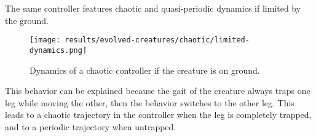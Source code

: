 \documentclass[main]{subfiles}
\begin{document}
The same controller features chaotic and quasi-periodic dynamics if limited by the ground. %

\begin{figure}[H]
\centering
\texttt{[image: results/evolved-creatures/chaotic/limited-dynamics.png]}
\caption[On ground controller dynamics]{Dynamics of a chaotic controller if the creature is on ground.}
\label{figure:walker1-on-ground-controller-dynamics}
\end{figure}

This behavior can be explained because the gait of the creature always traps one leg while moving the other, then the behavior switches to the other leg. %
%
This leads to a chaotic trajectory in the controller when the leg is completely trapped, and to a periodic trajectory when untrapped. %
\end{document}
